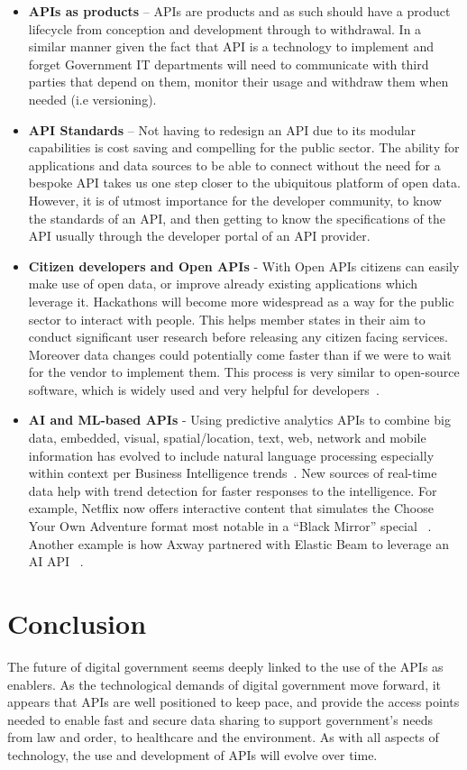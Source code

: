\begin{itemize}
	\item \textbf{APIs as products} – APIs are products and as such should have a
	product lifecycle from conception and development through to withdrawal.
	In a similar manner given the fact that API is a technology to implement and forget 
	Government IT departments will need to communicate with third parties that depend on them,
	monitor their usage and withdraw them when needed (i.e versioning).
	
	\item \textbf{API Standards} – Not having to redesign an API due to its modular
	capabilities is cost saving and compelling for the public sector.
	The ability for applications and data sources to be able to connect without
	the need for a bespoke API takes us one step closer to the ubiquitous platform
	of open data. However, it is of utmost importance for the developer community, to know the standards of an API,
	and then getting to know the specifications of the API usually through the developer
	portal of an API provider.
	
	\item \textbf{Citizen developers and Open APIs} - With Open APIs
	citizens can easily make use of	open data, or improve already existing applications which
	leverage it. Hackathons will become more widespread as a way for the public
	sector to interact with people. This helps member states in their aim to conduct significant user research before releasing any
	citizen facing services. Moreover data changes could potentially come
	faster than if we were to wait for the vendor to implement them. This process
	is very similar to open-source software, which is widely used and very
	helpful for developers~\citep{digital_first}.
	
	\item \textbf{AI and ML-based APIs} - Using predictive analytics APIs to combine big data, embedded, visual, spatial/location, text, web, network and mobile information has evolved to include natural language processing especially within context per Business Intelligence trends~\citep{bisurvey}.
	New sources of real-time data help with trend detection for faster responses to the intelligence. For example, Netflix now offers interactive content that simulates the Choose Your Own Adventure format most notable in a  “Black Mirror” special ~\citep{bms}. Another example is how Axway partnered with Elastic Beam to leverage an AI API ~\citep{axway}.
\end{itemize}

\section{Conclusion}

The future of digital government seems deeply linked to the use of the APIs as
enablers. As the technological demands of digital government move forward, it
appears that APIs are well positioned to keep pace, and provide the access points
needed to enable fast and secure data sharing to support government’s needs from
law and order, to healthcare and the environment. As with all aspects of technology,
the use and development of APIs will evolve over time.